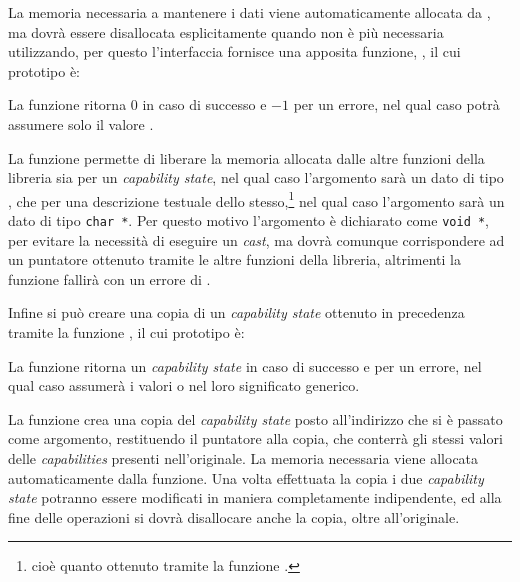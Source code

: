 La memoria necessaria a mantenere i dati viene automaticamente allocata da
, ma dovrà essere disallocata esplicitamente quando non è più
necessaria utilizzando, per questo l'interfaccia fornisce una apposita
funzione, , il cui prototipo è:

\begin{funcproto}{
}

{La funzione ritorna $0$ in caso di successo e $-1$ per un errore, nel qual
  caso  potrà assumere solo il valore .
}
\end{funcproto}


La funzione permette di liberare la memoria allocata dalle altre funzioni
della libreria sia per un \textit{capability state}, nel qual caso l'argomento
sarà un dato di tipo , che per una descrizione testuale dello
stesso,\footnote{cioè quanto ottenuto tramite la funzione
  .} nel qual caso l'argomento sarà un dato di tipo
\texttt{char *}. Per questo motivo l'argomento  è dichiarato
come \texttt{void *}, per evitare la necessità di eseguire un \textit{cast},
ma dovrà comunque corrispondere ad un puntatore ottenuto tramite le altre
funzioni della libreria, altrimenti la funzione fallirà con un errore di
.

Infine si può creare una copia di un \textit{capability state} ottenuto in
precedenza tramite la funzione , il cui prototipo è:

\begin{funcproto}{
}

{La funzione ritorna un \textit{capability state} in caso di successo e
   per un errore, nel qual caso  assumerà i valori
   o  nel loro significato generico.}
\end{funcproto}


La funzione crea una copia del \textit{capability state} posto all'indirizzo
 che si è passato come argomento, restituendo il puntatore alla
copia, che conterrà gli stessi valori delle \textit{capabilities} presenti
nell'originale. La memoria necessaria viene allocata automaticamente dalla
funzione. Una volta effettuata la copia i due \textit{capability state}
potranno essere modificati in maniera completamente indipendente, ed alla fine
delle operazioni si dovrà disallocare anche la copia, oltre all'originale.

